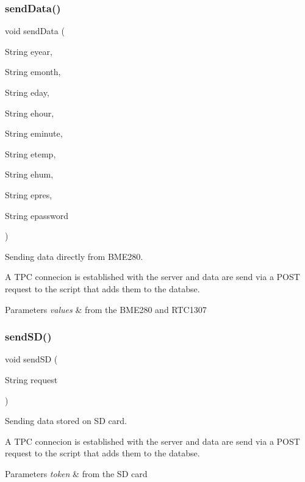 \subsubsection{\texorpdfstring{send\+Data()}{sendData()}}
{\footnotesize\ttfamily void send\+Data (\begin{DoxyParamCaption}\item[{String}]{eyear,  }\item[{String}]{emonth,  }\item[{String}]{eday,  }\item[{String}]{ehour,  }\item[{String}]{eminute,  }\item[{String}]{etemp,  }\item[{String}]{ehum,  }\item[{String}]{epres,  }\item[{String}]{epassword }\end{DoxyParamCaption})}



Sending data directly from B\+M\+E280. 

A T\+PC connecion is established with the server and data are send via a P\+O\+ST request to the script that adds them to the databse. 
\begin{DoxyParams}{Parameters}
{\em values} & from the B\+M\+E280 and R\+T\+C1307 \\
\hline
\end{DoxyParams}
\mbox{\label{_w_s_8ino_acca4eb89d9cb2ffb1d5d9fa19d429f9c}} 
\subsubsection{\texorpdfstring{send\+S\+D()}{sendSD()}}
{\footnotesize\ttfamily void send\+SD (\begin{DoxyParamCaption}\item[{String}]{request }\end{DoxyParamCaption})}



Sending data stored on SD card. 

A T\+PC connecion is established with the server and data are send via a P\+O\+ST request to the script that adds them to the databse. 
\begin{DoxyParams}{Parameters}
{\em token} & from the SD card \\
\hline
\end{DoxyParams}
\mbox{\label{_w_s_8ino_a4fc01d736fe50cf5b977f755b675f11d}} 
